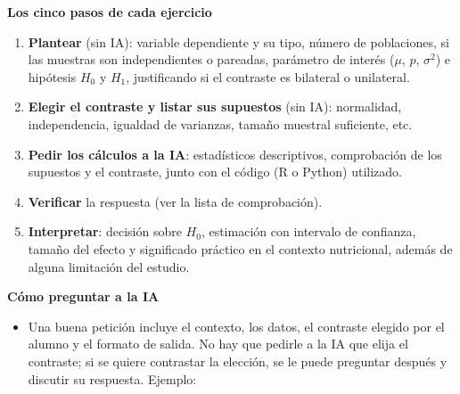 \documentclass[
  spanish,
  a4paper,
]{scrreport}
\providecommand{\tightlist}{%
  \setlength{\itemsep}{0pt}\setlength{\parskip}{0pt}}
\theoremstyle{definition}
\theoremstyle{remark}
\begin{document}
\begin{tcolorbox}[enhanced jigsaw, arc=.35mm, bottomrule=.15mm, bottomtitle=1mm, breakable, colback=white, colbacktitle=quarto-callout-note-color!10!white, colframe=quarto-callout-note-color-frame, coltitle=black, left=2mm, leftrule=.75mm, opacityback=0, opacitybacktitle=0.6, rightrule=.15mm, title=\textcolor{quarto-callout-note-color}{\faInfo}\hspace{0.5em}{Pautas para trabajar con la IA}, titlerule=0mm, toprule=.15mm, toptitle=1mm]

\textbf{Los cinco pasos de cada ejercicio}

\begin{enumerate}
\def\labelenumi{\arabic{enumi}.}
\tightlist
\item
  \textbf{Plantear} (sin IA): variable dependiente y su tipo, número de
  poblaciones, si las muestras son independientes o pareadas, parámetro
  de interés (\(\mu\), \(p\), \(\sigma^2\)) e hipótesis \(H_0\) y
  \(H_1\), justificando si el contraste es bilateral o unilateral.
\item
  \textbf{Elegir el contraste y listar sus supuestos} (sin IA):
  normalidad, independencia, igualdad de varianzas, tamaño muestral
  suficiente, etc.
\item
  \textbf{Pedir los cálculos a la IA}: estadísticos descriptivos,
  comprobación de los supuestos y el contraste, junto con el código (R o
  Python) utilizado.
\item
  \textbf{Verificar} la respuesta (ver la lista de comprobación).
\item
  \textbf{Interpretar}: decisión sobre \(H_0\), estimación con intervalo
  de confianza, tamaño del efecto y significado práctico en el contexto
  nutricional, además de alguna limitación del estudio.
\end{enumerate}

\textbf{Cómo preguntar a la IA}

\begin{itemize}
\item
  Una buena petición incluye el contexto, los datos, el contraste
  elegido por el alumno y el formato de salida. No hay que pedirle a la
  IA que elija el contraste; si se quiere contrastar la elección, se le
  puede preguntar después y discutir su respuesta. Ejemplo:


\end{itemize}
\end{tcolorbox}
\end{document}
